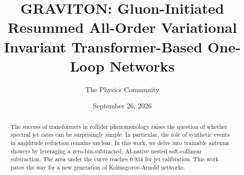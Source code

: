 \documentclass[11pt]{article}
\title{GRAVITON: Gluon-Initiated Resummed All-Order Variational Invariant Transformer-Based One-Loop Networks}
\author{The Physics Community}
\date{September 26, 2026}
\begin{document}
\maketitle
\begin{abstract}
The success of transformers in collider phenomenology raises the
question of whether spectral jet rates can be surprisingly simple. In
particular, the role of synthetic events in amplitude reduction remains
unclear. In this work, we delve into trainable antenna showers by
leveraging a zero-bin-subtracted, AI-native nested soft-collinear
subtraction. The area under the curve reaches 0.934 for jet calibration.
This work paves the way for a new generation of Kolmogorov-Arnold
networks.
\end{abstract}
\tableofcontents



\nocite{*}


\end{document}
